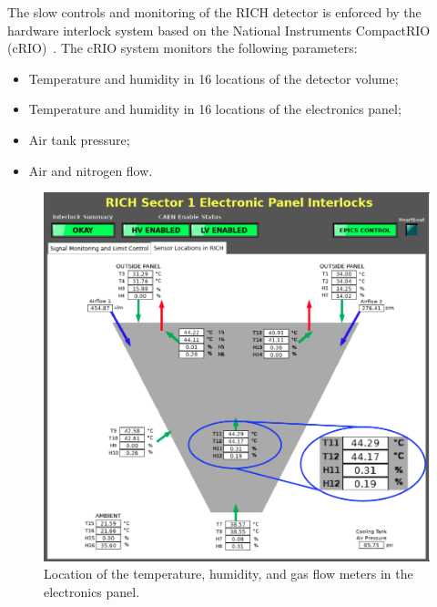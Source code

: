 \documentclass[5p,times,twocolumn]{elsarticle}
\begin{document}
The slow controls and monitoring of the RICH detector is enforced by the hardware interlock system based on the
National Instruments CompactRIO (cRIO)~\cite{Ref:cRIO}.
The cRIO system monitors the following parameters:
\begin{itemize}
\item Temperature and humidity in 16 locations of the detector volume;
\item Temperature and humidity in 16 locations of the electronics panel;
\item Air tank pressure;
\item Air and nitrogen flow. 
\end{itemize}

\begin{figure}[t]
\begin{center}
\includegraphics[width=0.9\columnwidth]{RICH_sensors_e_panel2.png}
\end{center}
\caption{Location of the temperature, humidity, and gas flow meters in the electronics panel.}
\label{Fig:RICH_sensors_e_panel}
\end{figure}
\end{document}
